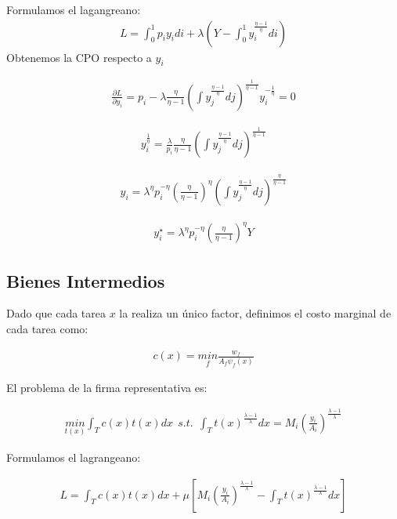 \documentclass{article}
\theoremstyle{remark}
\theoremstyle{definition}
\begin{document}
Formulamos el lagangreano:
\begin{align*}
    L = \int_{0}^{1} p_iy_i di + \lambda \left(Y-\int_{0}^{1}y_{i}^{\frac{\eta -1}{\eta}}di\right)
\end{align*}
Obtenemos la CPO respecto a $y_i$

\begin{align*}
    \frac{\partial L}{\partial y_i} = p_{i} - \lambda \frac{\eta}{\eta-1} \left(\int y_{j}^{\frac{\eta-1}{\eta}} dj\right)^{\frac{1}{\eta-1}}y_{i}^{-\frac{1}{\eta}} = 0 
\end{align*}

\begin{align*}
    y_i^{\frac{1}{\eta}} = \frac{\lambda}{p_{i}}\frac{\eta}{\eta-1} \left(\int y_{j}^{\frac{\eta-1}{\eta}} dj\right)^{\frac{1}{\eta-1}}
\end{align*}

\begin{align*}
    y_i = \lambda^{\eta} p_{i}^{-\eta}\left(\frac{\eta}{\eta-1}\right)^\eta \left(\int y_{j}^{\frac{\eta-1}{\eta}} dj\right)^{\frac{\eta}{\eta-1}}
\end{align*}

\begin{align*}
    y_i^{\star} = \lambda^{\eta} p_{i}^{-\eta}\left(\frac{\eta}{\eta-1}\right)^\eta Y
\end{align*}

\subsection{Bienes Intermedios}
Dado que cada tarea $x$ la realiza un \'unico factor, definimos el costo marginal de cada tarea como:

\begin{align*}
    c(x)=\underset{f}{min}\frac{w_f}{A_f\psi_f(x)}
\end{align*}

El problema de la firma representativa es:

\begin{align*}
    \underset{t(x)}{min} \int_{T}c(x)t(x)dx \ \ s.t. \ \ \int_{T}t(x)^{\frac{\lambda -1}{\lambda}}dx = M_i \left(\frac{y_i}{A_i}\right)^{\frac{\lambda-1}{\lambda}}
\end{align*}

Formulamos el lagrangeano:

\begin{align*}
    L = \int_T c(x)t(x) dx + \mu \left[M_i\left(\frac{y_i}{A_i}\right)^{\frac{\lambda-1}{\lambda}}-\int_{T}t(x)^{\frac{\lambda-1}{\lambda}}dx\right]
\end{align*}
\end{document}

